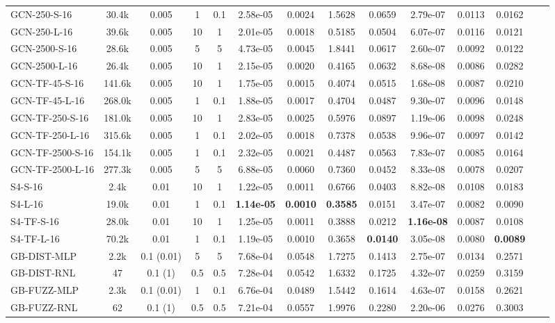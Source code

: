\begin{table*}[h]
{\begin{tabular}{lccccccccccccc}
            GCN-250-S-16 & 30.4k & 0.005 & 1 & 0.1 & 2.58e-05 & 0.0024 & 1.5628 & 0.0659 & 2.79e-07 & 0.0113 & 0.0162 \\
            GCN-250-L-16 & 39.6k & 0.005 & 10 & 1 & 2.01e-05 & 0.0018 & 0.5185 & 0.0504 & 6.07e-07 & 0.0116 & 0.0121 \\
            GCN-2500-S-16 & 28.6k & 0.005 & 5 & 5 & 4.73e-05 & 0.0045 & 1.8441 & 0.0617 & 2.60e-07 & 0.0092 & 0.0122 \\
            GCN-2500-L-16 & 26.4k & 0.005 & 10 & 1 & 2.15e-05 & 0.0020 & 0.4165 & 0.0632 & 8.68e-08 & 0.0086 & 0.0282 \\
            \hline
            GCN-TF-45-S-16 & 141.6k & 0.005 & 10 & 1 & 1.75e-05 & 0.0015 & 0.4074 & 0.0515 & 1.68e-08 & 0.0087 & 0.0210 \\
            GCN-TF-45-L-16 & 268.0k & 0.005 & 1 & 0.1 & 1.88e-05 & 0.0017 & 0.4704 & 0.0487 & 9.30e-07 & 0.0096 & 0.0148 \\
            GCN-TF-250-S-16 & 181.0k & 0.005 & 10 & 1 & 2.83e-05 & 0.0025 & 0.5976 & 0.0897 & 1.19e-06 & 0.0098 & 0.0248 \\
            GCN-TF-250-L-16 & 315.6k & 0.005 & 1 & 0.1 & 2.02e-05 & 0.0018 & 0.7378 & 0.0538 & 9.96e-07 & 0.0097 & 0.0142 \\
            GCN-TF-2500-S-16 & 154.1k & 0.005 & 1 & 0.1 & 2.32e-05 & 0.0021 & 0.4487 & 0.0563 & 7.83e-07 & 0.0085 & 0.0164 \\
            GCN-TF-2500-L-16 & 277.3k & 0.005 & 5 & 5 & 6.88e-05 & 0.0060 & 0.7360 & 0.0452 & 8.33e-08 & 0.0078 & 0.0207 \\
            \hline
            S4-S-16 & 2.4k & 0.01 & 10 & 1 & 1.22e-05 & 0.0011 & 0.6766 & 0.0403 & 8.82e-08 & 0.0108 & 0.0183 \\
            S4-L-16 & 19.0k & 0.01 & 1 & 0.1 & \textbf{1.14e-05} & \textbf{0.0010} & \textbf{0.3585} & 0.0151 & 3.47e-07 & 0.0082 & 0.0090 \\
            \hline
            S4-TF-S-16 & 28.0k & 0.01 & 10 & 1 & 1.25e-05 & 0.0011 & 0.3888 & 0.0212 & \textbf{1.16e-08} & 0.0087 & 0.0108 \\
            S4-TF-L-16 & 70.2k & 0.01 & 1 & 0.1 & 1.19e-05 & 0.0010 & 0.3658 & \textbf{0.0140} & 3.05e-08 & 0.0080 & \textbf{0.0089} \\
            \hline
            GB-DIST-MLP & 2.2k & 0.1 (0.01) & 5 & 5 & 7.68e-04 & 0.0548 & 1.7275 & 0.1413 & 2.75e-07 & 0.0134 & 0.2571 \\
            GB-DIST-RNL & 47 & 0.1 (1) & 0.5 & 0.5 & 7.28e-04 & 0.0542 & 1.6332 & 0.1725 & 4.32e-07 & 0.0259 & 0.3159 \\
            \hline
            GB-FUZZ-MLP & 2.3k & 0.1 (0.01) & 1 & 0.1 & 6.76e-04 & 0.0489 & 1.5442 & 0.1614 & 4.63e-07 & 0.0158 & 0.2621 \\
            GB-FUZZ-RNL & 62 & 0.1 (1) & 0.5 & 0.5 & 7.21e-04 & 0.0557 & 1.9976 & 0.2280 & 2.20e-06 & 0.0276 & 0.3003 \\
            \hline
            \hline
        \end{tabular}
    }
\end{table*}


